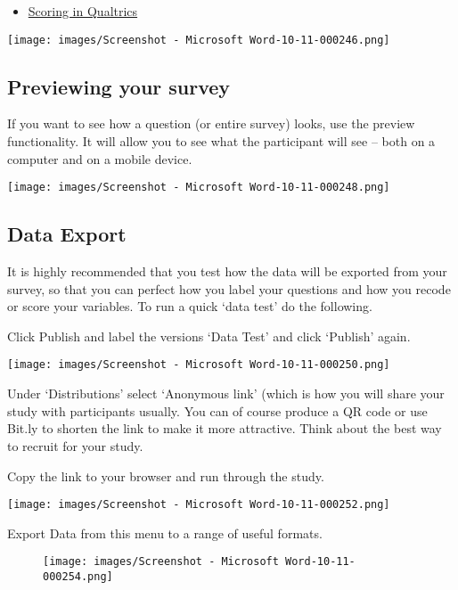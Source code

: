 \documentclass[
  letterpaper,
  DIV=11,
  numbers=noendperiod]{scrartcl}
\providecommand{\tightlist}{%
  \setlength{\itemsep}{0pt}\setlength{\parskip}{0pt}}\usepackage{longtable,booktabs,array}
\begin{document}
\begin{itemize}
\tightlist
\item
  \href{https://www.qualtrics.com/support/survey-platform/survey-module/survey-tools/scoring/\#Introduction}{Scoring
  in Qualtrics}
\end{itemize}

\texttt{[image: images/Screenshot - Microsoft Word-10-11-000246.png]}

\subsection{Previewing your survey}\label{previewing-your-survey}

If you want to see how a question (or entire survey) looks, use the
preview functionality. It will allow you to see what the participant
will see -- both on a computer and on a mobile device.

\texttt{[image: images/Screenshot - Microsoft Word-10-11-000248.png]}

\subsection{Data Export}\label{data-export}

It is highly recommended that you test how the data will be exported
from your survey, so that you can perfect how you label your questions
and how you recode or score your variables. To run a quick `data test'
do the following.

Click Publish and label the versions `Data Test' and click `Publish'
again.

\texttt{[image: images/Screenshot - Microsoft Word-10-11-000250.png]}

Under `Distributions' select `Anonymous link' (which is how you will
share your study with participants usually. You can of course produce a
QR code or use Bit.ly to shorten the link to make it more attractive.
Think about the best way to recruit for your study.

Copy the link to your browser and run through the study.

\texttt{[image: images/Screenshot - Microsoft Word-10-11-000252.png]}

Export Data from this menu to a range of useful formats.

\begin{figure}[H]

{\centering \texttt{[image: images/Screenshot - Microsoft Word-10-11-000254.png]}

}

\end{figure}%
\end{document}

